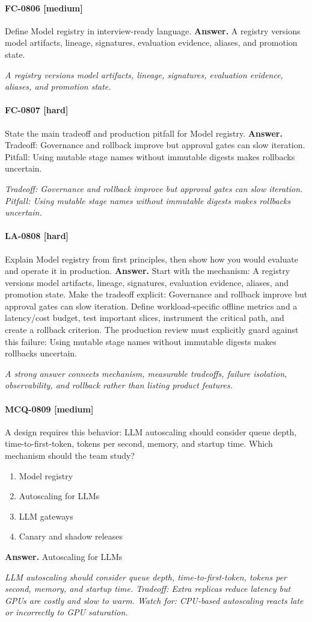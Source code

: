 \paragraph{FC-0806 [medium]} Define Model registry in interview-ready language.
\noindent\textbf{Answer.} A registry versions model artifacts, lineage, signatures, evaluation evidence, aliases, and promotion state.
\par\textit{A registry versions model artifacts, lineage, signatures, evaluation evidence, aliases, and promotion state.}
\paragraph{FC-0807 [hard]} State the main tradeoff and production pitfall for Model registry.
\noindent\textbf{Answer.} Tradeoff: Governance and rollback improve but approval gates can slow iteration. Pitfall: Using mutable stage names without immutable digests makes rollbacks uncertain.
\par\textit{Tradeoff: Governance and rollback improve but approval gates can slow iteration. Pitfall: Using mutable stage names without immutable digests makes rollbacks uncertain.}
\paragraph{LA-0808 [hard]} Explain Model registry from first principles, then show how you would evaluate and operate it in production.
\noindent\textbf{Answer.} Start with the mechanism: A registry versions model artifacts, lineage, signatures, evaluation evidence, aliases, and promotion state. Make the tradeoff explicit: Governance and rollback improve but approval gates can slow iteration. Define workload-specific offline metrics and a latency/cost budget, test important slices, instrument the critical path, and create a rollback criterion. The production review must explicitly guard against this failure: Using mutable stage names without immutable digests makes rollbacks uncertain.
\par\textit{A strong answer connects mechanism, measurable tradeoffs, failure isolation, observability, and rollback rather than listing product features.}
\paragraph{MCQ-0809 [medium]} A design requires this behavior: LLM autoscaling should consider queue depth, time-to-first-token, tokens per second, memory, and startup time. Which mechanism should the team study?
\begin{enumerate}[label=\Alph*.]
\item Model registry
\item Autoscaling for LLMs
\item LLM gateways
\item Canary and shadow releases
\end{enumerate}
\noindent\textbf{Answer.} Autoscaling for LLMs
\par\textit{LLM autoscaling should consider queue depth, time-to-first-token, tokens per second, memory, and startup time. Tradeoff: Extra replicas reduce latency but GPUs are costly and slow to warm. Watch for: CPU-based autoscaling reacts late or incorrectly to GPU saturation.}
